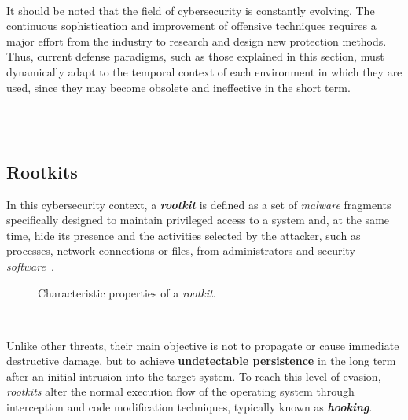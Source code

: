 \

It should be noted that the field of cybersecurity is constantly evolving. The continuous sophistication and improvement of offensive techniques requires a major effort from the industry to research and design new protection methods.
Thus, current defense paradigms, such as those explained in this section, must dynamically adapt to the temporal context of each environment in which they are used, since they may become obsolete and ineffective in the short term.\\

\

\

\subsection{Rootkits}
\label{sec:rootkits}

In this cybersecurity context, a \textbf{\textit{rootkit}} is defined as a set of \textit{malware} fragments specifically designed to maintain privileged access to a system and, at the same time, hide its presence and the activities selected by the attacker, such as processes, network connections or files, from administrators and security \textit{software}~\cite{rootkits}.\\

\begin{figure}[h!]
  \centering
  \makebox[\textwidth][c]{\scalebox{1.2}{}}
  \caption{Characteristic properties of a \textit{rootkit}.}
  \label{fig:rootkits_layers}
\end{figure}

\

Unlike other threats, their main objective is not to propagate or cause immediate destructive damage, but to achieve \textbf{undetectable persistence} in the long term after an initial intrusion into the target system.
To reach this level of evasion, \textit{rootkits} alter the normal execution flow of the operating system through interception and code modification techniques, typically known as \textbf{\textit{hooking}}.\\

